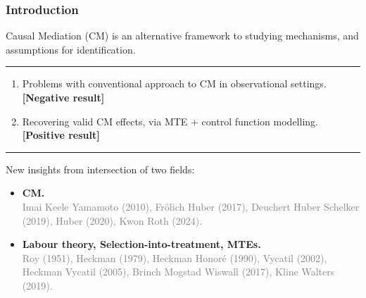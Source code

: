 \documentclass[dvipsnames]{beamer} %
\begin{document}
\begin{frame}
    \frametitle{Introduction}
    Causal Mediation (CM) is an alternative framework to studying mechanisms, and assumptions for identification.

    \par\noindent\rule{\textwidth}{0.4pt}
    \begin{enumerate}
        \item Problems with conventional approach to CM in observational settings.
        \\ \textbf{[Negative result]}
        \item Recovering valid CM effects, via MTE $+$ control function modelling.
        \\ \textbf{[Positive result]}
    \end{enumerate}

    \par\noindent\rule{\textwidth}{0.4pt}
    New insights from intersection of two fields:
    \begin{itemize}
        \item \textbf{CM.}
        \\ \textcolor{gray}{\footnotesize Imai Keele Yamamoto (2010), Fr\"olich Huber (2017), Deuchert Huber Schelker (2019), Huber (2020), Kwon Roth (2024).}
        \item \textbf{Labour theory, Selection-into-treatment, MTEs.}
        \\ \textcolor{gray}{\footnotesize Roy (1951), Heckman (1979), Heckman Honor\'e (1990), Vycatil (2002), Heckman Vycatil (2005), Brinch Mogstad Wiswall (2017), Kline Walters (2019).}
    \end{itemize}
\end{frame}
\end{document}
